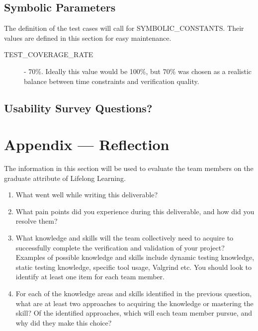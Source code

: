 \documentclass[12pt, titlepage]{article}
\begin{document}
\subsection{Symbolic Parameters}

The definition of the test cases will call for SYMBOLIC\_CONSTANTS.
Their values are defined in this section for easy maintenance.\\

\begin{description}
  \item[TEST\_COVERAGE\_RATE] - 70\%. Ideally this value would be 100\%, but 70\% was chosen as a realistic balance between time constraints and verification quality.
\end{description}

\subsection{Usability Survey Questions?}


\newpage{}
\section*{Appendix --- Reflection}


The information in this section will be used to evaluate the team members on the
graduate attribute of Lifelong Learning.



\begin{enumerate}
  \item What went well while writing this deliverable?
  \item What pain points did you experience during this deliverable, and how
    did you resolve them?
  \item What knowledge and skills will the team collectively need to acquire to
  successfully complete the verification and validation of your project?
  Examples of possible knowledge and skills include dynamic testing knowledge,
  static testing knowledge, specific tool usage, Valgrind etc.  You should look to
  identify at least one item for each team member.
  \item For each of the knowledge areas and skills identified in the previous
  question, what are at least two approaches to acquiring the knowledge or
  mastering the skill?  Of the identified approaches, which will each team
  member pursue, and why did they make this choice?
\end{enumerate}
\end{document}
